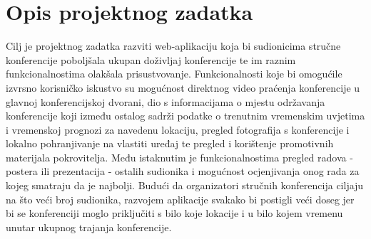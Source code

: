 \chapter{Opis projektnog zadatka}
		
		
		

		Cilj je projektnog zadatka razviti web-aplikaciju koja bi sudionicima stručne konferencije poboljšala ukupan doživljaj konferencije te im raznim funkcionalnostima olakšala prisustvovanje. Funkcionalnosti koje bi omogućile izvrsno korisničko iskustvo su mogućnost direktnog video praćenja konferencije u glavnoj konferencijskoj dvorani, dio s informacijama o mjestu održavanja konferencije koji između ostalog sadrži podatke o trenutnim vremenskim uvjetima i vremenskoj prognozi za navedenu lokaciju, pregled fotografija s konferencije i lokalno pohranjivanje na vlastiti uređaj te pregled i korištenje promotivnih materijala pokrovitelja. Među istaknutim je funkcionalnostima pregled radova - postera ili prezentacija - ostalih sudionika i mogućnost ocjenjivanja onog rada za kojeg smatraju da je najbolji. Budući da organizatori stručnih konferencija ciljaju na što veći broj sudionika, razvojem aplikacije svakako bi postigli veći doseg jer bi se konferenciji moglo priključiti s bilo koje lokacije i u bilo kojem vremenu unutar ukupnog trajanja konferencije.\\

